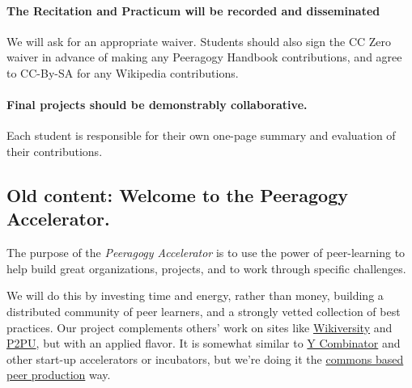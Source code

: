 \hypertarget{the-recitation-and-practicum-will-be-recorded-and-disseminated}{%
\paragraph{The Recitation and Practicum will be recorded and
disseminated}\label{the-recitation-and-practicum-will-be-recorded-and-disseminated}}

We will ask for an appropriate waiver. Students should also sign the CC
Zero waiver in advance of making any Peeragogy Handbook contributions,
and agree to CC-By-SA for any Wikipedia contributions.

\hypertarget{final-projects-should-be-demonstrably-collaborative.}{%
\paragraph{Final projects should be demonstrably
collaborative.}\label{final-projects-should-be-demonstrably-collaborative.}}

Each student is responsible for their own one-page summary and
evaluation of their contributions.

\hypertarget{old-content-welcome-to-the-peeragogy-accelerator.}{%
\subsection{Old content: Welcome to the Peeragogy
Accelerator.}\label{old-content-welcome-to-the-peeragogy-accelerator.}}

The purpose of the \emph{Peeragogy Accelerator} is to use the power of
peer-learning to help build great organizations, projects, and to work
through specific challenges.

We will do this by investing time and energy, rather than money,
building a distributed community of peer learners, and a strongly vetted
collection of best practices. Our project complements others' work on
sites like
\href{https://en.wikiversity.org/wiki/Wikiversity:Main_Page}{Wikiversity}
and \href{https://www.p2pu.org/en/}{P2PU}, but with an applied flavor.
It is somewhat similar to \href{https://www.ycombinator.com/}{Y
Combinator} and other start-up accelerators or incubators, but we're
doing it the
\href{https://en.wikipedia.org/wiki/Commons-based_peer_production}{commons
based peer production} way.

